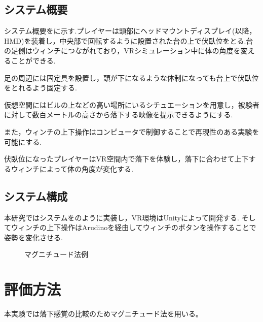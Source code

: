 \documentclass[uplatex]{jsarticle}
\begin{document}
\subsection{システム概要}
システム概要をに示す.プレイヤーは頭部にヘッドマウントディスプレイ(以降，HMD)を装着し，中央部で回転するように設置された台の上で伏臥位をとる.台の足側はウィンチにつながれており，VRシミュレーション中に体の角度を変えることができる.

足の周辺には固定具を設置し，頭が下になるような体制になっても台上で伏臥位をとれるよう固定する.

仮想空間にはビルの上などの高い場所にいるシチュエーションを用意し，被験者に対して数百メートルの高さから落下する映像を提示できるようにする.

また，ウィンチの上下操作はコンピュータで制御することで再現性のある実験を可能にする.

伏臥位になったプレイヤーはVR空間内で落下を体験し，落下に合わせて上下するウィンチによって体の角度が変化する.

\subsection{システム構成}
本研究ではシステムをのように実装し，VR環境はUnityによって開発する.
そしてウィンチの上下操作はArudinoを経由してウィンチのボタンを操作することで姿勢を変化させる.


 \begin{figure}[tb]
  \centering
  \caption{マグニチュード法例}
  \label{fig:magnitude}

\end{figure}

\section{評価方法}
本実験では落下感覚の比較のためマグニチュード法を用いる。
\end{document}
